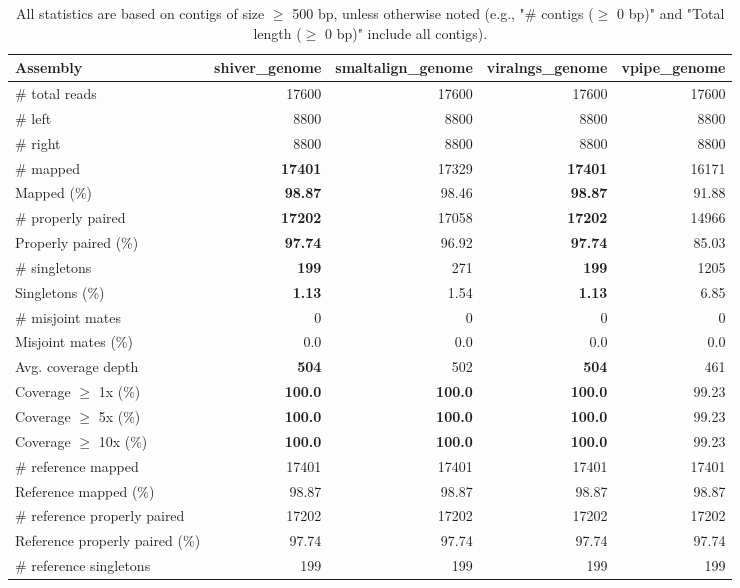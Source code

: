 \documentclass[12pt,a4paper]{article}
\begin{document}
\begin{table}[ht]
\begin{center}
\caption{All statistics are based on contigs of size $\geq$ 500 bp, unless otherwise noted (e.g., "\# contigs ($\geq$ 0 bp)" and "Total length ($\geq$ 0 bp)" include all contigs).}
\begin{tabular}{|l*{4}{|r}|}
\hline
Assembly & shiver\_genome & smaltalign\_genome & viralngs\_genome & vpipe\_genome \\ \hline
\# total reads & 17600 & 17600 & 17600 & 17600 \\ \hline
\# left & 8800 & 8800 & 8800 & 8800 \\ \hline
\# right & 8800 & 8800 & 8800 & 8800 \\ \hline
\# mapped & {\bf 17401} & 17329 & {\bf 17401} & 16171 \\ \hline
Mapped (\%) & {\bf 98.87} & 98.46 & {\bf 98.87} & 91.88 \\ \hline
\# properly paired & {\bf 17202} & 17058 & {\bf 17202} & 14966 \\ \hline
Properly paired (\%) & {\bf 97.74} & 96.92 & {\bf 97.74} & 85.03 \\ \hline
\# singletons & {\bf 199} & 271 & {\bf 199} & 1205 \\ \hline
Singletons (\%) & {\bf 1.13} & 1.54 & {\bf 1.13} & 6.85 \\ \hline
\# misjoint mates & 0 & 0 & 0 & 0 \\ \hline
Misjoint mates (\%) & 0.0 & 0.0 & 0.0 & 0.0 \\ \hline
Avg. coverage depth & {\bf 504} & 502 & {\bf 504} & 461 \\ \hline
Coverage $\geq$ 1x (\%) & {\bf 100.0} & {\bf 100.0} & {\bf 100.0} & 99.23 \\ \hline
Coverage $\geq$ 5x (\%) & {\bf 100.0} & {\bf 100.0} & {\bf 100.0} & 99.23 \\ \hline
Coverage $\geq$ 10x (\%) & {\bf 100.0} & {\bf 100.0} & {\bf 100.0} & 99.23 \\ \hline
\# reference mapped & 17401 & 17401 & 17401 & 17401 \\ \hline
Reference mapped (\%) & 98.87 & 98.87 & 98.87 & 98.87 \\ \hline
\# reference properly paired & 17202 & 17202 & 17202 & 17202 \\ \hline
Reference properly paired (\%) & 97.74 & 97.74 & 97.74 & 97.74 \\ \hline
\# reference singletons & 199 & 199 & 199 & 199 \\ \hline

\end{tabular}
\end{center}
\end{table}
\end{document}
